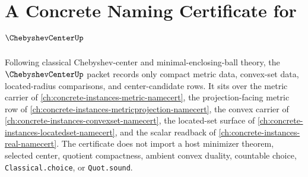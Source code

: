 \chapter{A Concrete Naming Certificate for $\ChebyshevCenterUp$}
\label{ch:concrete-instances-chebyshev-center-namecert}

Following classical Chebyshev-center and minimal-enclosing-ball theory, the $\ChebyshevCenterUp$ packet records only compact metric data, convex-set data, located-radius comparisons, and center-candidate rows. It sits over the metric carrier of \autoref{ch:concrete-instances-metric-namecert}, the projection-facing metric row of \autoref{ch:concrete-instances-metricprojection-namecert}, the convex carrier of \autoref{ch:concrete-instances-convexset-namecert}, the located-set surface of \autoref{ch:concrete-instances-locatedset-namecert}, and the scalar readback of \autoref{ch:concrete-instances-real-namecert}. The certificate does not import a host minimizer theorem, selected center, quotient compactness, ambient convex duality, countable choice, \texttt{Classical.choice}, or \texttt{Quot.sound}.

